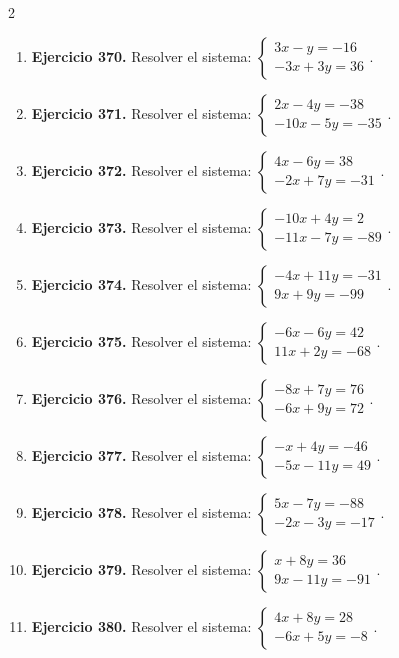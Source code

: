 \documentclass[10pt,a4paper]{article}
\begin{document}
\begin{multicols}{2}
\begin{enumerate}[label=\textbf{\arabic*.}]
\item \textbf{Ejercicio 370.} Resolver el sistema: \(\begin{cases}3 x - y=-16\\- 3 x + 3 y=36\end{cases}\).
\item \textbf{Ejercicio 371.} Resolver el sistema: \(\begin{cases}2 x - 4 y=-38\\- 10 x - 5 y=-35\end{cases}\).
\item \textbf{Ejercicio 372.} Resolver el sistema: \(\begin{cases}4 x - 6 y=38\\- 2 x + 7 y=-31\end{cases}\).
\item \textbf{Ejercicio 373.} Resolver el sistema: \(\begin{cases}- 10 x + 4 y=2\\- 11 x - 7 y=-89\end{cases}\).
\item \textbf{Ejercicio 374.} Resolver el sistema: \(\begin{cases}- 4 x + 11 y=-31\\9 x + 9 y=-99\end{cases}\).
\item \textbf{Ejercicio 375.} Resolver el sistema: \(\begin{cases}- 6 x - 6 y=42\\11 x + 2 y=-68\end{cases}\).
\item \textbf{Ejercicio 376.} Resolver el sistema: \(\begin{cases}- 8 x + 7 y=76\\- 6 x + 9 y=72\end{cases}\).
\item \textbf{Ejercicio 377.} Resolver el sistema: \(\begin{cases}- x + 4 y=-46\\- 5 x - 11 y=49\end{cases}\).
\item \textbf{Ejercicio 378.} Resolver el sistema: \(\begin{cases}5 x - 7 y=-88\\- 2 x - 3 y=-17\end{cases}\).
\item \textbf{Ejercicio 379.} Resolver el sistema: \(\begin{cases}x + 8 y=36\\9 x - 11 y=-91\end{cases}\).
\item \textbf{Ejercicio 380.} Resolver el sistema: \(\begin{cases}4 x + 8 y=28\\- 6 x + 5 y=-8\end{cases}\).
\end{enumerate}
\end{multicols}
\end{document}
